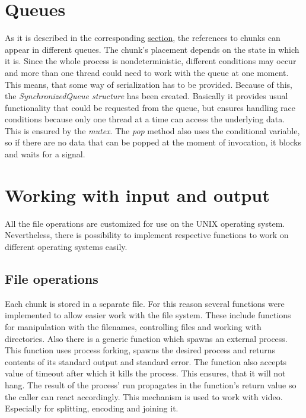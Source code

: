 \section{Queues}\label{queues}

As it is described in the corresponding
\hyperref[distribution-of-chunks]{section}, the references to chunks can
appear in different queues. The chunk's placement depends on the state
in which it is. Since the whole process is nondeterministic, different
conditions may occur and more than one thread could need to work with
the queue at one moment. This means, that some way of serialization has
to be provided. Because of this, the
\textit{SynchronizedQueue structure} has been created. Basically it
provides usual functionality that could be requested from the queue, but
ensures handling race conditions because only one thread at a time can
access the underlying data. This is ensured by the \textit{mutex}. The
\textit{pop} method also uses the conditional variable, so if there are
no data that can be popped at the moment of invocation, it blocks and
waits for a signal.

\section{Working with input and
output}\label{working-with-input-and-output}

All the file operations are customized for use on the UNIX operating
system. Nevertheless, there is possibility to implement respective
functions to work on different operating systems easily.

\subsection*{File operations}

Each chunk is stored in a separate file. For this reason several
functions were implemented to allow easier work with the file system.
These include functions for manipulation with the filenames, controlling
files and working with directories. Also there is a generic function
which spawns an external process. This function uses process forking,
spawns the desired process and returns contents of its standard output
and standard error. The function also accepts value of timeout after
which it kills the process. This ensures, that it will not hang. The
result of the process' run propagates in the function's return value so
the caller can react accordingly. This mechanism is used to work with
video. Especially for splitting, encoding and joining it.

